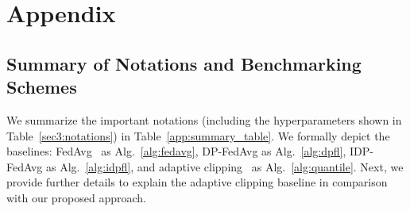 \section{Appendix}

\subsection{
{Summary of Notations} and  Benchmarking Schemes}\label{app:benchmark}
{We summarize the important notations (including the hyperparameters shown in Table~\ref{sec3:notations}) in Table~\ref{app:summary_table}. We formally depict the baselines: FedAvg~\citep{mcmahan2017communication} as Alg.~\ref{alg:fedavg}, DP-FedAvg as Alg.~\ref{alg:dpfl}, IDP-FedAvg as Alg.~\ref{alg:idpfl}, and adaptive clipping~\citep{andrew2021differentially} as Alg.~\ref{alg:quantile}. Next, we provide further details to explain the adaptive clipping baseline in comparison with our proposed approach.}


